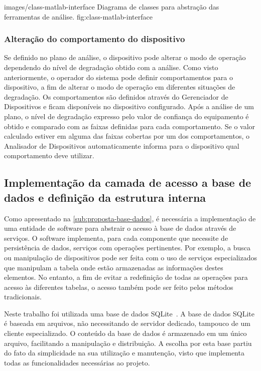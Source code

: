   {images/class-matlab-interface}
  {Diagrama de classes para abstração das ferramentas de análise.}
  {fig:class-matlab-interface}


\subsubsection{Alteração do comportamento do dispositivo}

Se definido no plano de análise, o dispositivo pode alterar o modo de operação dependendo do nível
de degradação obtido com a análise. Como visto anteriormente, o operador do sistema pode definir
comportamentos para o dispositivo, a fim de alterar o modo de operação em diferentes situações de
degradação. Os comportamentos são definidos através do Gerenciador de Dispositivos e ficam
disponíveis no dispositivo configurado. Após a análise de um plano, o nível de degradação expresso
pelo valor de confiança do equipamento é obtido e comparado com as faixas definidas para cada
comportamento. Se o valor calculado estiver em alguma das faixas cobertas por um dos comportamentos,
o Analisador de Dispositivos automaticamente informa para o dispositivo qual comportamento deve
utilizar.


\subsection{Implementação da camada de acesso a base de dados e definição da estrutura interna}

Como apresentado na \cref{sub:proposta-base-dados}, é necessária a implementação de uma entidade de
software para abstrair o acesso à base de dados através de serviços. O software implementa, para
cada componente que necessite de persistência de dados, serviços com operações pertinentes. Por
exemplo, a busca ou manipulação de dispositivos pode ser feita com o uso de serviços especializados
que manipulam a tabela onde estão armazenadas as informações destes elementos. No entanto, a fim de
evitar a redefinição de todas as operações para acesso às diferentes tabelas, o acesso também pode
ser feito pelos métodos tradicionais.

Neste trabalho foi utilizada uma base de dados SQLite~\cite{sqlite2013homepage}. A base de dados
SQLite é baseada em arquivos, não necessitando de servidor dedicado, tampouco de um cliente
especializado. O conteúdo da base de dados é armazenado em um único arquivo, facilitando a
manipulação e distribuição. A escolha por esta base partiu do fato da simplicidade na sua utilização
e manutenção, visto que implementa todas as funcionalidades necessárias ao projeto.

